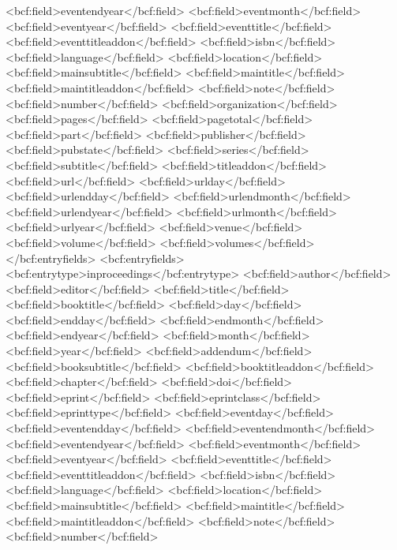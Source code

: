       <bcf:field>eventendyear</bcf:field>
      <bcf:field>eventmonth</bcf:field>
      <bcf:field>eventyear</bcf:field>
      <bcf:field>eventtitle</bcf:field>
      <bcf:field>eventtitleaddon</bcf:field>
      <bcf:field>isbn</bcf:field>
      <bcf:field>language</bcf:field>
      <bcf:field>location</bcf:field>
      <bcf:field>mainsubtitle</bcf:field>
      <bcf:field>maintitle</bcf:field>
      <bcf:field>maintitleaddon</bcf:field>
      <bcf:field>note</bcf:field>
      <bcf:field>number</bcf:field>
      <bcf:field>organization</bcf:field>
      <bcf:field>pages</bcf:field>
      <bcf:field>pagetotal</bcf:field>
      <bcf:field>part</bcf:field>
      <bcf:field>publisher</bcf:field>
      <bcf:field>pubstate</bcf:field>
      <bcf:field>series</bcf:field>
      <bcf:field>subtitle</bcf:field>
      <bcf:field>titleaddon</bcf:field>
      <bcf:field>url</bcf:field>
      <bcf:field>urlday</bcf:field>
      <bcf:field>urlendday</bcf:field>
      <bcf:field>urlendmonth</bcf:field>
      <bcf:field>urlendyear</bcf:field>
      <bcf:field>urlmonth</bcf:field>
      <bcf:field>urlyear</bcf:field>
      <bcf:field>venue</bcf:field>
      <bcf:field>volume</bcf:field>
      <bcf:field>volumes</bcf:field>
    </bcf:entryfields>
    <bcf:entryfields>
      <bcf:entrytype>inproceedings</bcf:entrytype>
      <bcf:field>author</bcf:field>
      <bcf:field>editor</bcf:field>
      <bcf:field>title</bcf:field>
      <bcf:field>booktitle</bcf:field>
      <bcf:field>day</bcf:field>
      <bcf:field>endday</bcf:field>
      <bcf:field>endmonth</bcf:field>
      <bcf:field>endyear</bcf:field>
      <bcf:field>month</bcf:field>
      <bcf:field>year</bcf:field>
      <bcf:field>addendum</bcf:field>
      <bcf:field>booksubtitle</bcf:field>
      <bcf:field>booktitleaddon</bcf:field>
      <bcf:field>chapter</bcf:field>
      <bcf:field>doi</bcf:field>
      <bcf:field>eprint</bcf:field>
      <bcf:field>eprintclass</bcf:field>
      <bcf:field>eprinttype</bcf:field>
      <bcf:field>eventday</bcf:field>
      <bcf:field>eventendday</bcf:field>
      <bcf:field>eventendmonth</bcf:field>
      <bcf:field>eventendyear</bcf:field>
      <bcf:field>eventmonth</bcf:field>
      <bcf:field>eventyear</bcf:field>
      <bcf:field>eventtitle</bcf:field>
      <bcf:field>eventtitleaddon</bcf:field>
      <bcf:field>isbn</bcf:field>
      <bcf:field>language</bcf:field>
      <bcf:field>location</bcf:field>
      <bcf:field>mainsubtitle</bcf:field>
      <bcf:field>maintitle</bcf:field>
      <bcf:field>maintitleaddon</bcf:field>
      <bcf:field>note</bcf:field>
      <bcf:field>number</bcf:field>
